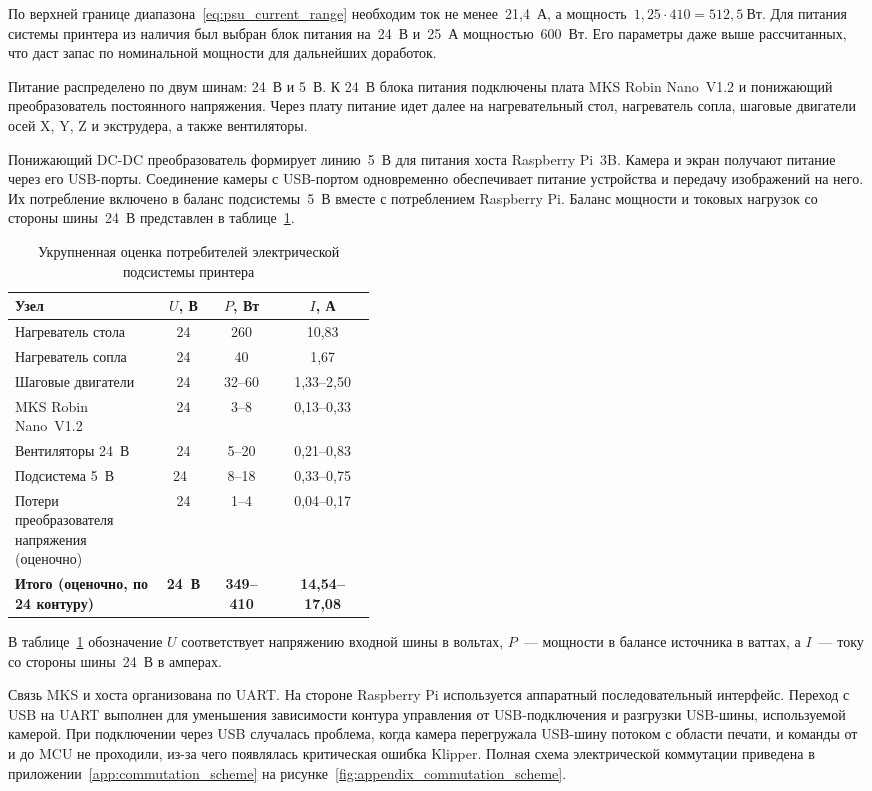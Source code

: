 По верхней границе диапазона~\eqref{eq:psu_current_range} необходим ток не менее~21,4~А, а мощность~\(1{,}25 \cdot 410 = 512{,}5~\text{Вт}\). Для питания системы принтера из наличия был выбран блок питания на~24~В и~25~А мощностью~600~Вт. Его параметры даже выше рассчитанных, что даст запас по номинальной мощности для дальнейших доработок.

Питание распределено по двум шинам: 24~В и 5~В. К 24~В блока питания подключены плата MKS Robin Nano~V1.2 и понижающий преобразователь постоянного напряжения. Через плату питание идет далее на нагревательный стол, нагреватель сопла, шаговые двигатели осей X, Y, Z и экструдера, а также вентиляторы.

Понижающий DC-DC преобразователь формирует линию~5~В для питания хоста Raspberry Pi~3B. Камера и экран получают питание через его USB-порты. Соединение камеры с USB-портом одновременно обеспечивает питание устройства и передачу изображений на него. Их потребление включено в баланс подсистемы~5~В вместе с потреблением Raspberry Pi. Баланс мощности и токовых нагрузок со стороны шины~24~В представлен в таблице~\ref{table:power_consumers}.

\begin{table}[h!]
\caption{Укрупненная оценка потребителей электрической подсистемы принтера}
\label{table:power_consumers}
\small
\renewcommand{\arraystretch}{1.2}
\begin{tabular}{|p{0.42\linewidth}|c|c|c|}
\hline
\textbf{Узел} & \textbf{\(U\), В} & \textbf{\(P\), Вт} & \textbf{\(I\), А} \tabularnewline
\hline
Нагреватель стола & 24 & 260 & 10,83 \tabularnewline
\hline
Нагреватель сопла & 24 & 40 & 1,67 \tabularnewline
\hline
Шаговые двигатели & 24 & 32--60 & 1,33--2,50 \tabularnewline
\hline
MKS Robin Nano~V1.2 & 24 & 3--8 & 0,13--0,33 \tabularnewline
\hline
Вентиляторы 24~В & 24 & 5--20 & 0,21--0,83 \tabularnewline
\hline
Подсистема 5~В & 24~& 8--18 & 0,33--0,75 \tabularnewline
\hline
Потери преобразователя напряжения (оценочно) & 24 & 1--4 & 0,04--0,17 \tabularnewline
\hline
\textbf{Итого (оценочно, по 24 контуру)} & \textbf{24~В} & \textbf{349--410} & \textbf{14,54--17,08} \tabularnewline
\hline
\end{tabular}
\end{table}

В таблице~\ref{table:power_consumers} обозначение \(U\) соответствует напряжению входной шины в вольтах, \(P\)~--- мощности в балансе источника в ваттах, а \(I\)~--- току со стороны шины~24~В в амперах.

Связь MKS и хоста организована по UART. На стороне Raspberry Pi используется аппаратный последовательный интерфейс. Переход с USB на UART выполнен для уменьшения зависимости контура управления от USB-подключения и разгрузки USB-шины, используемой камерой. При подключении через USB случалась проблема, когда камера перегружала USB-шину потоком с области печати, и команды от и до MCU не проходили, из-за чего появлялась критическая ошибка Klipper. Полная схема электрической коммутации приведена в приложении~\ref{app:commutation_scheme} на рисунке~\ref{fig:appendix_commutation_scheme}.

